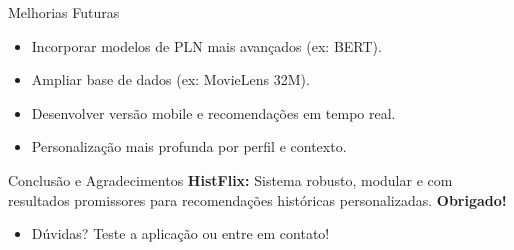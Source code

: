 \documentclass{beamer}
\begin{document}
\begin{frame}{Melhorias Futuras}
    \begin{itemize}
        \item Incorporar modelos de PLN mais avançados (ex: BERT).
        \item Ampliar base de dados (ex: MovieLens 32M).
        \item Desenvolver versão mobile e recomendações em tempo real.
        \item Personalização mais profunda por perfil e contexto.
    \end{itemize}
\end{frame}

\begin{frame}{Conclusão e Agradecimentos}
    \textbf{HistFlix:} Sistema robusto, modular e com resultados promissores para recomendações históricas personalizadas.
    \vspace{0.5cm}
    \textbf{Obrigado!}
    \vspace{0.5cm}
    \begin{itemize}
        \item Dúvidas? Teste a aplicação ou entre em contato!
    \end{itemize}
\end{frame}
\end{document}
